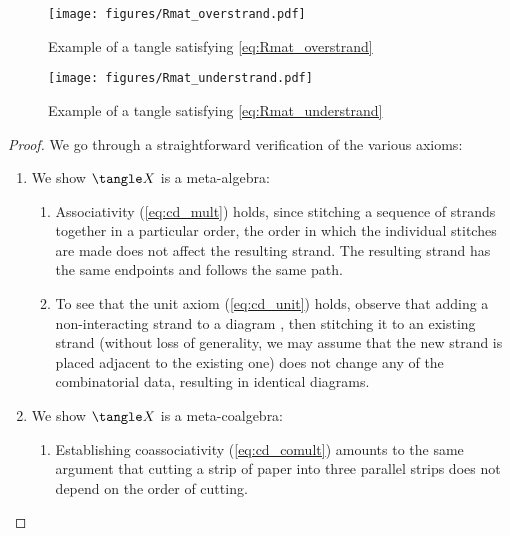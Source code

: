 \begin{figure}[h]
        \centering
        \texttt{[image: figures/Rmat\_overstrand.pdf]}
        \caption{Example of a tangle satisfying \cref{eq:Rmat_overstrand}}
        \label{fig:Rmat_overstrand}
\end{figure}
\begin{figure}[h]
        \centering
        \texttt{[image: figures/Rmat\_understrand.pdf]}
        \caption{Example of a tangle satisfying \cref{eq:Rmat_understrand}}
        \label{fig:Rmat_understrand}
\end{figure}
\begin{proof}
We go through a straightforward verification of the various axioms:
\begin{enumerate}
        \item We show $\tangle X$ is a meta-algebra:
                \begin{enumerate}
                        \item Associativity (\cref{eq:cd_mult}) holds, since
                                stitching a sequence of strands together in a
                                particular order, the order in which the
                                individual stitches are made does not affect the
                                resulting strand. The resulting strand has the
                                same endpoints and follows the same path.
                        \item To see that the unit axiom (\cref{eq:cd_unit})
                                holds, observe that adding a non-interacting
                                strand to a diagram , then stitching it to an
                                existing strand (without loss of generality,
                                we may assume that the new strand is placed
                                adjacent to the existing one) does not change
                                any of the combinatorial data, resulting in
                                identical diagrams.
                \end{enumerate}
        \item We show $\tangle X$ is a meta-coalgebra:
                \begin{enumerate}
                        \item Establishing coassociativity (\cref{eq:cd_comult})
                                amounts to the same argument that cutting a
                                strip of paper into three parallel strips does
                                not depend on the order of cutting.

\end{enumerate}
\end{enumerate}
\end{proof}
